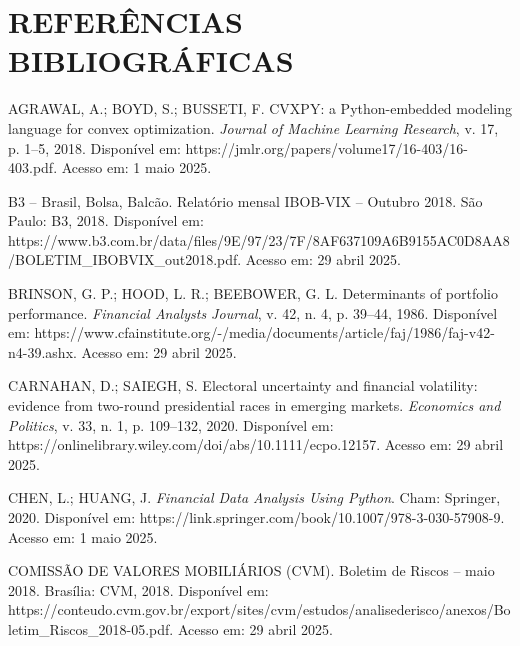 
\chapter*{REFERÊNCIAS BIBLIOGRÁFICAS}

\vspace{1cm}


\begin{thebibliography}{99}

AGRAWAL, A.; BOYD, S.; BUSSETI, F. CVXPY: a Python-embedded modeling language for convex optimization. \textit{Journal of Machine Learning Research}, v. 17, p. 1--5, 2018. Disponível em: https://jmlr.org/papers/volume17/16-403/16-403.pdf. Acesso em: 1 maio 2025.

B3 -- Brasil, Bolsa, Balcão. Relatório mensal IBOB-VIX -- Outubro 2018. São Paulo: B3, 2018. Disponível em: https://www.b3.com.br/data/files/9E/97/23/7F/8AF637109A6B9155AC0D8AA8/BOLETIM\_IBOBVIX\_out2018.pdf. Acesso em: 29 abril 2025.

BRINSON, G. P.; HOOD, L. R.; BEEBOWER, G. L. Determinants of portfolio performance. \textit{Financial Analysts Journal}, v. 42, n. 4, p. 39--44, 1986. Disponível em: https://www.cfainstitute.org/-/media/documents/article/faj/1986/faj-v42-n4-39.ashx. Acesso em: 29 abril 2025.

CARNAHAN, D.; SAIEGH, S. Electoral uncertainty and financial volatility: evidence from two-round presidential races in emerging markets. \textit{Economics and Politics}, v. 33, n. 1, p. 109--132, 2020. Disponível em: https://onlinelibrary.wiley.com/doi/abs/10.1111/ecpo.12157. Acesso em: 29 abril 2025.

CHEN, L.; HUANG, J. \textit{Financial Data Analysis Using Python}. Cham: Springer, 2020. Disponível em: https://link.springer.com/book/10.1007/978-3-030-57908-9. Acesso em: 1 maio 2025.

COMISSÃO DE VALORES MOBILIÁRIOS (CVM). Boletim de Riscos -- maio 2018. Brasília: CVM, 2018. Disponível em: https://conteudo.cvm.gov.br/export/sites/cvm/estudos/analisederisco/anexos/Boletim\_Riscos\_2018-05.pdf. Acesso em: 29 abril 2025.


\end{thebibliography}

